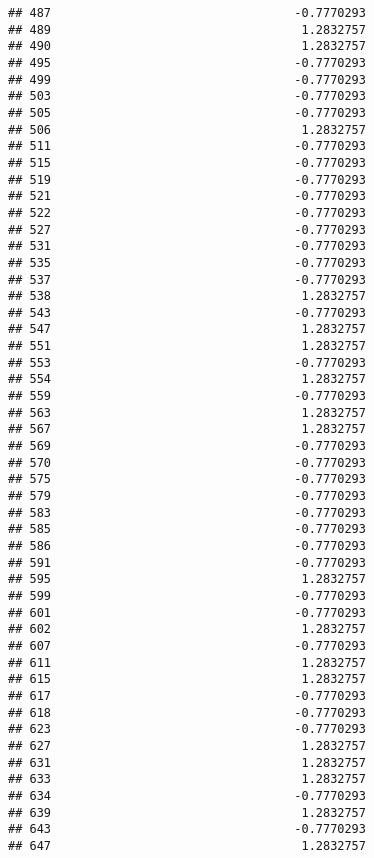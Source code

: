 \documentclass[
]{article}
\begin{document}
\begin{verbatim}
## 487                                  -0.7770293
## 489                                   1.2832757
## 490                                   1.2832757
## 495                                  -0.7770293
## 499                                  -0.7770293
## 503                                  -0.7770293
## 505                                  -0.7770293
## 506                                   1.2832757
## 511                                  -0.7770293
## 515                                  -0.7770293
## 519                                  -0.7770293
## 521                                  -0.7770293
## 522                                  -0.7770293
## 527                                  -0.7770293
## 531                                  -0.7770293
## 535                                  -0.7770293
## 537                                  -0.7770293
## 538                                   1.2832757
## 543                                  -0.7770293
## 547                                   1.2832757
## 551                                   1.2832757
## 553                                  -0.7770293
## 554                                   1.2832757
## 559                                  -0.7770293
## 563                                   1.2832757
## 567                                   1.2832757
## 569                                  -0.7770293
## 570                                  -0.7770293
## 575                                  -0.7770293
## 579                                  -0.7770293
## 583                                  -0.7770293
## 585                                  -0.7770293
## 586                                  -0.7770293
## 591                                  -0.7770293
## 595                                   1.2832757
## 599                                  -0.7770293
## 601                                  -0.7770293
## 602                                   1.2832757
## 607                                  -0.7770293
## 611                                   1.2832757
## 615                                   1.2832757
## 617                                  -0.7770293
## 618                                  -0.7770293
## 623                                  -0.7770293
## 627                                   1.2832757
## 631                                   1.2832757
## 633                                   1.2832757
## 634                                  -0.7770293
## 639                                   1.2832757
## 643                                  -0.7770293
## 647                                   1.2832757

\end{verbatim}
\end{document}
